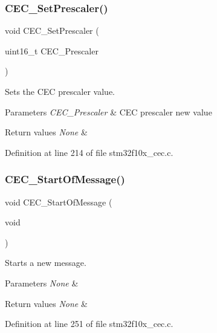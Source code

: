 \subsubsection{\texorpdfstring{C\+E\+C\+\_\+\+Set\+Prescaler()}{CEC\_SetPrescaler()}}
{\footnotesize\ttfamily void C\+E\+C\+\_\+\+Set\+Prescaler (\begin{DoxyParamCaption}\item[{uint16\+\_\+t}]{C\+E\+C\+\_\+\+Prescaler }\end{DoxyParamCaption})}



Sets the C\+EC prescaler value. 


\begin{DoxyParams}{Parameters}
{\em C\+E\+C\+\_\+\+Prescaler} & C\+EC prescaler new value \\
\hline
\end{DoxyParams}

\begin{DoxyRetVals}{Return values}
{\em None} & \\
\hline
\end{DoxyRetVals}


Definition at line 214 of file stm32f10x\+\_\+cec.\+c.

\mbox{\label{group___c_e_c___private___functions_ga71e700461ffe7820d9e1c75da65fd0fb}} 
\subsubsection{\texorpdfstring{C\+E\+C\+\_\+\+Start\+Of\+Message()}{CEC\_StartOfMessage()}}
{\footnotesize\ttfamily void C\+E\+C\+\_\+\+Start\+Of\+Message (\begin{DoxyParamCaption}\item[{void}]{ }\end{DoxyParamCaption})}



Starts a new message. 


\begin{DoxyParams}{Parameters}
{\em None} & \\
\hline
\end{DoxyParams}

\begin{DoxyRetVals}{Return values}
{\em None} & \\
\hline
\end{DoxyRetVals}


Definition at line 251 of file stm32f10x\+\_\+cec.\+c.

